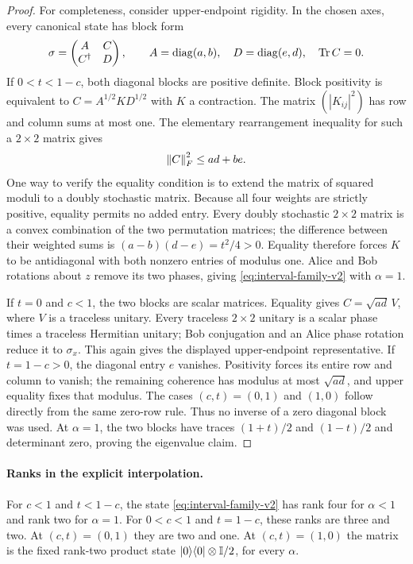 \begin{proof}
For completeness, consider upper-endpoint rigidity. In the chosen axes,
every canonical state has block form
\[
 \sigma=\begin{pmatrix}A&C\\C^\dagger&D\end{pmatrix},\qquad
 A=\operatorname{diag}(a,b),\quad D=\operatorname{diag}(e,d),\quad\operatorname{Tr} C=0.
\]
If $0<t<1-c$, both diagonal blocks are positive definite. Block positivity
is equivalent to $C=A^{1/2}KD^{1/2}$ with $K$ a contraction. The matrix
$(|K_{ij}|^2)$ has row and column sums at most one. The elementary
rearrangement inequality for such a $2\times2$ matrix gives
\[
 \left\lVert C\right\rVert_F^2\leq ad+be.
\]
One way to verify the equality condition is to extend the matrix of squared
moduli to a doubly stochastic matrix. Because all four weights are strictly
positive, equality permits no added entry. Every doubly stochastic
$2\times2$ matrix is a convex combination of the two permutation matrices;
the difference between their weighted sums is
$(a-b)(d-e)=t^2/4>0$. Equality therefore forces $K$ to be antidiagonal with
both nonzero entries of modulus one. Alice and Bob rotations about $z$
remove its two phases, giving \eqref{eq:interval-family-v2} with $\alpha=1$.

If $t=0$ and $c<1$, the two blocks are scalar matrices. Equality gives
$C=\sqrt{ad}\,V$, where $V$ is a traceless unitary. Every traceless
$2\times2$ unitary is a scalar phase times a traceless Hermitian unitary;
Bob conjugation and an Alice phase rotation reduce it to $\sigma_x$.
This again gives the displayed upper-endpoint representative. If
$t=1-c>0$, the diagonal entry $e$ vanishes. Positivity forces its entire row
and column to vanish; the remaining coherence has modulus at most
$\sqrt{ad}$, and upper equality fixes that modulus. The cases $(c,t)=(0,1)$
and $(1,0)$ follow directly from the same zero-row rule. Thus no inverse of
a zero diagonal block was used. At $\alpha=1$, the two blocks have traces
$(1+t)/2$ and $(1-t)/2$ and determinant zero, proving the eigenvalue claim.
\end{proof}

\paragraph{Ranks in the explicit interpolation.}
For $c<1$ and $t<1-c$, the state \eqref{eq:interval-family-v2} has rank four
for $\alpha<1$ and rank two for $\alpha=1$. For $0<c<1$ and $t=1-c$, these
ranks are three and two. At $(c,t)=(0,1)$ they are two and one. At
$(c,t)=(1,0)$ the matrix is the fixed rank-two product state
$|0\rangle\langle0|\otimes\mathbb I/2$, for every $\alpha$.

